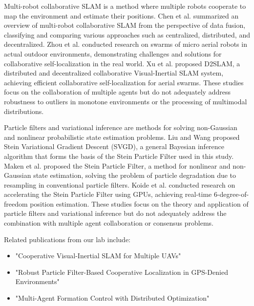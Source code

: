 \documentclass[a4paper,fleqn,10pt,twocolumn]{SICE_ISCS}
\begin{document}
Multi-robot collaborative SLAM is a method where multiple robots cooperate to map the environment and estimate their positions. Chen et al. \cite{Chen2021} summarized an overview of multi-robot collaborative SLAM from the perspective of data fusion, classifying and comparing various approaches such as centralized, distributed, and decentralized. Zhou et al. \cite{Zhou2018} conducted research on swarms of micro aerial robots in actual outdoor environments, demonstrating challenges and solutions for collaborative self-localization in the real world. Xu et al. \cite{Xu2020} proposed D2SLAM, a distributed and decentralized collaborative Visual-Inertial SLAM system, achieving efficient collaborative self-localization for aerial swarms. These studies focus on the collaboration of multiple agents but do not adequately address robustness to outliers in monotone environments or the processing of multimodal distributions.

Particle filters and variational inference are methods for solving non-Gaussian and nonlinear probabilistic state estimation problems. Liu and Wang \cite{Liu2016} proposed Stein Variational Gradient Descent (SVGD), a general Bayesian inference algorithm that forms the basis of the Stein Particle Filter used in this study. Maken et al. \cite{Maken2021} proposed the Stein Particle Filter, a method for nonlinear and non-Gaussian state estimation, solving the problem of particle degradation due to resampling in conventional particle filters. Koide et al. \cite{Koide2021} conducted research on accelerating the Stein Particle Filter using GPUs, achieving real-time 6-degree-of-freedom position estimation. These studies focus on the theory and application of particle filters and variational inference but do not adequately address the combination with multiple agent collaboration or consensus problems.

Related publications from our lab include:
\begin{itemize}
\item "Cooperative Visual-Inertial SLAM for Multiple UAVs"
\item "Robust Particle Filter-Based Cooperative Localization in GPS-Denied Environments"
\item "Multi-Agent Formation Control with Distributed Optimization"
\end{itemize}
\end{document}
